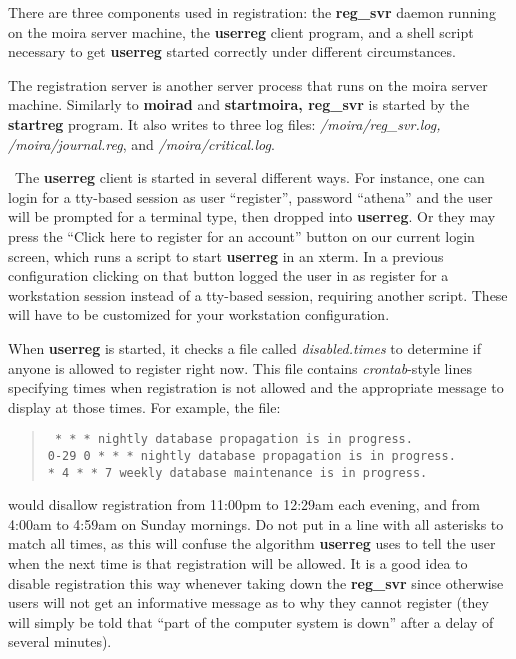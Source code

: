 There are three components used in registration: the {\bf reg\_svr}
daemon running on the moira server machine, the {\bf userreg} client
program, and a shell script necessary to get {\bf userreg} started
correctly under different circumstances. 

The registration server is another server process that runs on the
moira server machine.  Similarly to {\bf moirad} and {\bf startmoira,
reg\_svr} is started by the {\bf startreg} program.  It also writes to
three log files: {\it /moira/reg\_svr.log, /moira/journal.reg}, and
{\it /moira/critical.log}.

\athena\ The {\bf userreg} client is started in several different
ways.  For instance, one can login for a tty-based session as user
``register'', password ``athena'' and the user will be prompted for a
terminal type, then dropped into {\bf userreg}.  Or they may press the
``Click here to register for an account'' button on our current login
screen, which runs a script to start {\bf userreg} in an xterm.  In a
previous configuration clicking on that button logged the user in as
register for a workstation session instead of a tty-based session,
requiring another script.  These will have to be customized for your
workstation configuration.

When {\bf userreg} is started, it checks a file called
{\em disabled.times} to determine if anyone is allowed to register right
now.  This file contains {\em crontab}-style lines specifying times when
registration is not allowed and the appropriate message to display at
those times.  For example, the file:
\begin{quotation}\tt
{} * * *	nightly database propagation is in progress.\\
0-29 0 * * *	nightly database propagation is in progress.\\
* 4 * * 7	weekly database maintenance is in progress.
\end{quotation}
would disallow registration from 11:00pm to 12:29am each evening, and
from 4:00am to 4:59am on Sunday mornings.  Do not put in a line with
all asterisks to match all times, as this will confuse the algorithm
{\bf userreg} uses to tell the user when the next time is that
registration will be allowed.  It is a good idea to disable
registration this way whenever taking down the {\bf reg\_svr} since
otherwise users will not get an informative message as to why they
cannot register (they will simply be told that ``part of the computer
system is down'' after a delay of several minutes).

